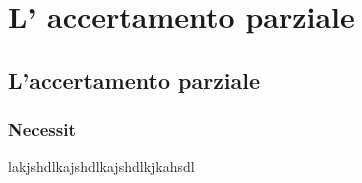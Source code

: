 \part{L' accertamento parziale}
\chapter{L'accertamento parziale }
\section{Necessit}
lakjshdlkajshdlkajshdlkjkahsdl
